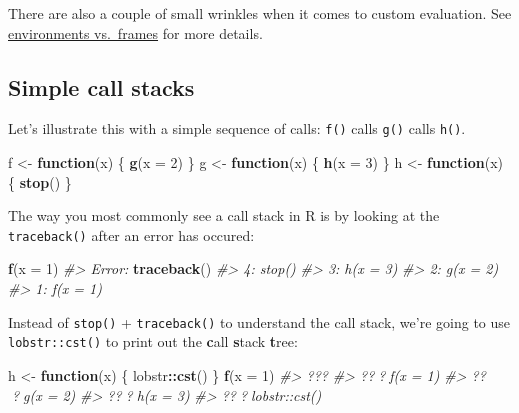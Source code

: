 \documentclass[]{book}
\newenvironment{Shaded}{\begin{snugshade}}{\end{snugshade}}
\newcommand{\KeywordTok}[1]{\textcolor[rgb]{0.13,0.29,0.53}{\textbf{#1}}}
\newcommand{\DataTypeTok}[1]{\textcolor[rgb]{0.13,0.29,0.53}{#1}}
\newcommand{\DecValTok}[1]{\textcolor[rgb]{0.00,0.00,0.81}{#1}}
\newcommand{\StringTok}[1]{\textcolor[rgb]{0.31,0.60,0.02}{#1}}
\newcommand{\CommentTok}[1]{\textcolor[rgb]{0.56,0.35,0.01}{\textit{#1}}}
\newcommand{\ControlFlowTok}[1]{\textcolor[rgb]{0.13,0.29,0.53}{\textbf{#1}}}
\newcommand{\OperatorTok}[1]{\textcolor[rgb]{0.81,0.36,0.00}{\textbf{#1}}}
\newcommand{\NormalTok}[1]{#1}
\theoremstyle{definition}
\theoremstyle{definition}
\theoremstyle{definition}
\theoremstyle{remark}
\begin{document}
There are also a couple of small wrinkles when it comes to custom
evaluation. See \protect\hyperlink{eval-frame}{environments vs.~frames}
for more details.

\subsection{Simple call stacks}\label{simple-call-stacks}

Let's illustrate this with a simple sequence of calls: \texttt{f()}
calls \texttt{g()} calls \texttt{h()}.

\begin{Shaded}
\begin{Highlighting}[]
\NormalTok{f <-}\StringTok{ }\ControlFlowTok{function}\NormalTok{(x) \{}
  \KeywordTok{g}\NormalTok{(}\DataTypeTok{x =} \DecValTok{2}\NormalTok{)}
\NormalTok{\}}
\NormalTok{g <-}\StringTok{ }\ControlFlowTok{function}\NormalTok{(x) \{}
  \KeywordTok{h}\NormalTok{(}\DataTypeTok{x =} \DecValTok{3}\NormalTok{)}
\NormalTok{\}}
\NormalTok{h <-}\StringTok{ }\ControlFlowTok{function}\NormalTok{(x) \{}
  \KeywordTok{stop}\NormalTok{()}
\NormalTok{\}}
\end{Highlighting}
\end{Shaded}

The way you most commonly see a call stack in R is by looking at the
\texttt{traceback()} after an error has occured:

\begin{Shaded}
\begin{Highlighting}[]
\KeywordTok{f}\NormalTok{(}\DataTypeTok{x =} \DecValTok{1}\NormalTok{)}
\CommentTok{#> Error:}
\KeywordTok{traceback}\NormalTok{()}
\CommentTok{#> 4: stop()}
\CommentTok{#> 3: h(x = 3) }
\CommentTok{#> 2: g(x = 2)}
\CommentTok{#> 1: f(x = 1)}
\end{Highlighting}
\end{Shaded}

Instead of \texttt{stop()} + \texttt{traceback()} to understand the call
stack, we're going to use \texttt{lobstr::cst()} to print out the
\textbf{c}all \textbf{s}tack \textbf{t}ree:

\begin{Shaded}
\begin{Highlighting}[]
\NormalTok{h <-}\StringTok{ }\ControlFlowTok{function}\NormalTok{(x) \{}
\NormalTok{  lobstr}\OperatorTok{::}\KeywordTok{cst}\NormalTok{()}
\NormalTok{\}}
\KeywordTok{f}\NormalTok{(}\DataTypeTok{x =} \DecValTok{1}\NormalTok{)}
\CommentTok{#> ???}
\CommentTok{#> ???f(x = 1)}
\CommentTok{#>   ???g(x = 2)}
\CommentTok{#>     ???h(x = 3)}
\CommentTok{#>       ???lobstr::cst()}
\end{Highlighting}
\end{Shaded}
\end{document}
